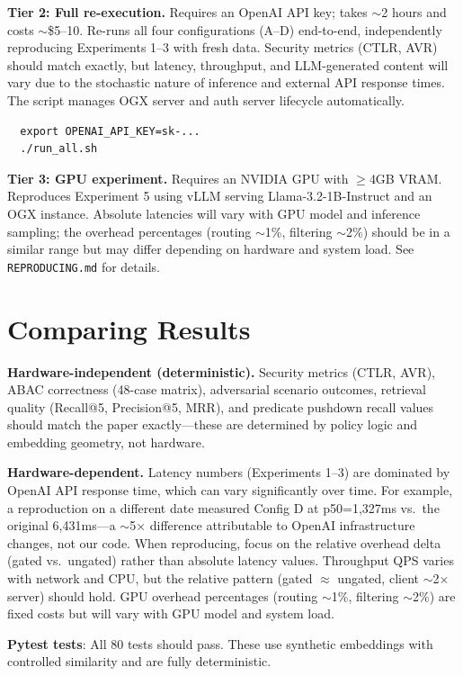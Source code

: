 \documentclass[sigconf]{acmart}
\begin{document}
\textbf{Tier 2: Full re-execution.} Requires an OpenAI API key; takes ${\sim}$2 hours and costs ${\sim}$\$5--10. Re-runs all four configurations (A--D) end-to-end, independently reproducing Experiments 1--3 with fresh data. Security metrics (CTLR, AVR) should match exactly, but latency, throughput, and LLM-generated content will vary due to the stochastic nature of inference and external API response times. The script manages OGX server and auth server lifecycle automatically.
\begin{verbatim}
  export OPENAI_API_KEY=sk-...
  ./run_all.sh
\end{verbatim}

\textbf{Tier 3: GPU experiment.} Requires an NVIDIA GPU with ${\geq}$4GB VRAM. Reproduces Experiment 5 using vLLM serving Llama-3.2-1B-Instruct and an OGX instance. Absolute latencies will vary with GPU model and inference sampling; the overhead percentages (routing ${\sim}$1\%, filtering ${\sim}$2\%) should be in a similar range but may differ depending on hardware and system load. See \texttt{REPRODUCING.md} for details.

\section{Comparing Results}

\textbf{Hardware-independent (deterministic).} Security metrics (CTLR, AVR), ABAC correctness (48-case matrix), adversarial scenario outcomes, retrieval quality (Recall@5, Precision@5, MRR), and predicate pushdown recall values should match the paper exactly---these are determined by policy logic and embedding geometry, not hardware.

\textbf{Hardware-dependent.} Latency numbers (Experiments 1--3) are dominated by OpenAI API response time, which can vary significantly over time. For example, a reproduction on a different date measured Config D at p50=1,327ms vs.\ the original 6,431ms---a ${\sim}$5$\times$ difference attributable to OpenAI infrastructure changes, not our code. When reproducing, focus on the relative overhead delta (gated vs.\ ungated) rather than absolute latency values. Throughput QPS varies with network and CPU, but the relative pattern (gated ${\approx}$ ungated, client ${\sim}$2$\times$ server) should hold. GPU overhead percentages (routing ${\sim}$1\%, filtering ${\sim}$2\%) are fixed costs but will vary with GPU model and system load.

\textbf{Pytest tests}: All 80 tests should pass. These use synthetic embeddings with controlled similarity and are fully deterministic.
\end{document}

